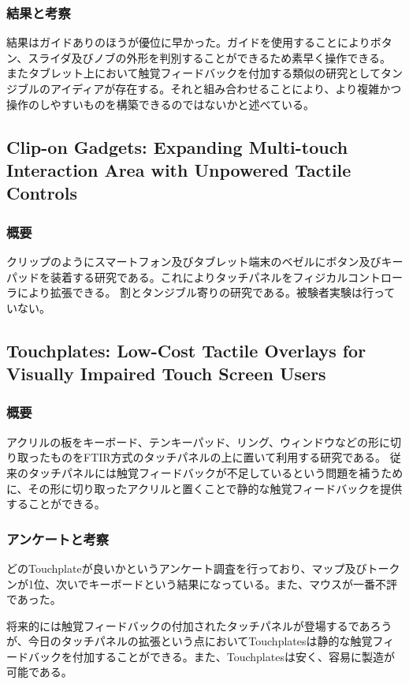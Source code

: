 \documentclass[11pt,a4paper]{jarticle}
\begin{document}
\subsubsection{結果と考察}
結果はガイドありのほうが優位に早かった。ガイドを使用することによりボタン、スライダ及びノブの外形を判別することができるため素早く操作できる。
またタブレット上において触覚フィードバックを付加する類似の研究としてタンジブルのアイディアが存在する。それと組み合わせることにより、より複雑かつ操作のしやすいものを構築できるのではないかと述べている。

\subsection{Clip-on Gadgets: Expanding Multi-touch
Interaction Area with Unpowered Tactile Controls\cite{Yu:2011:CGE:2047196.2047243}}
\subsubsection{概要}
クリップのようにスマートフォン及びタブレット端末のベゼルにボタン及びキーパッドを装着する研究である。これによりタッチパネルをフィジカルコントローラにより拡張できる。
割とタンジブル寄りの研究である。被験者実験は行っていない。


\subsection{Touchplates: Low-Cost Tactile Overlays for Visually
Impaired Touch Screen Users\cite{Kane:2013:TLT:2513383.2513442}}
\subsubsection{概要}
アクリルの板をキーボード、テンキーパッド、リング、ウィンドウなどの形に切り取ったものをFTIR方式のタッチパネルの上に置いて利用する研究である。
従来のタッチパネルには触覚フィードバックが不足しているという問題を補うために、その形に切り取ったアクリルと置くことで静的な触覚フィードバックを提供することができる。
\subsubsection{アンケートと考察}
どのTouchplateが良いかというアンケート調査を行っており、マップ及びトークンが1位、次いでキーボードという結果になっている。また、マウスが一番不評であった。

将来的には触覚フィードバックの付加されたタッチパネルが登場するであろうが、今日のタッチパネルの拡張という点においてTouchplatesは静的な触覚フィードバックを付加することができる。また、Touchplatesは安く、容易に製造が可能である。
\end{document}
